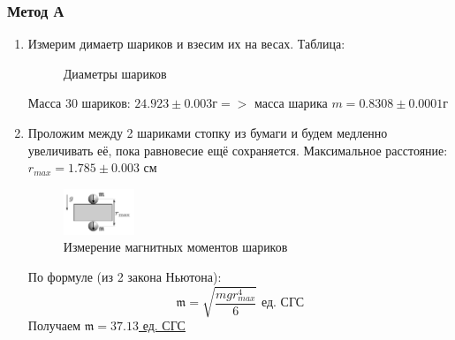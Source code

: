\documentclass[12pt,a4paper]{article}
\newcommand{\mk}{\mathfrak}
\begin{document}
\subsubsection{Метод А}
\begin{enumerate}
  \item Измерим димаетр шариков и взесим их на весах. Таблица:
  \begin{figure}[H]
    \label{tab:diametrs}
    \caption{Диаметры шариков}
  \end{figure}
  Масса 30 шариков: $24.923 \pm 0.003 \text{г} => $ масса шарика $m=0.8308 \pm 0.0001\text{г}$
  \item Проложим между 2 шариками стопку из бумаги и будем медленно увеличивать её, пока равновесие ещё сохраняется. Максимальное расстояние: $r_{max} = 1.785 \pm 0.003$ см
  \begin{figure}[H]
    \includegraphics*[width=0.2\textwidth]{2023-10-01-23-50-52.png}
    \caption{Измерение магнитных моментов шариков}
    \label{ust:met_a}
  \end{figure}
  По формуле \scriptsize(из 2 закона Ньютона)\normalsize:
  $$\mathfrak{m}=\sqrt{\frac{mgr^4_{max}}{6}} \text{ ед. СГС}$$
  Получаем \underline{$\mk m = 37.13$ ед. СГС}
\end{enumerate}
\end{document}
